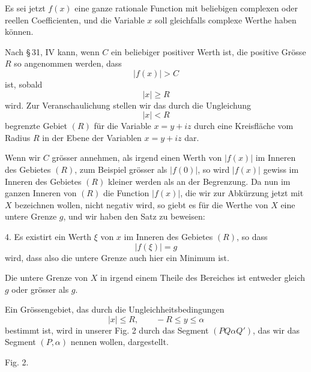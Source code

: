 \documentclass[11pt]{article}
\begin{document}
Es sei jetzt $f(x)$ eine ganze rationale Function mit beliebigen complexen oder reellen Coefficienten, und die Variable $x$ soll gleichfalls complexe Werthe haben können.

Nach \S\,31, IV kann, wenn $C$ ein beliebiger positiver Werth ist, die positive Grösse $R$ so angenommen werden, dass
\begin{equation}
 |f(x)|>C
\tag{4}
\end{equation}
ist, sobald
\begin{equation}
 |x|\ge R
\tag{5}
\end{equation}
wird. Zur Veranschaulichung stellen wir das durch die Ungleichung
\[
 |x|<R
\]
begrenzte Gebiet $(R)$ für die Variable $x=y+iz$ durch eine Kreisfläche vom Radius $R$ in der Ebene der Variablen $x=y+iz$ dar.

Wenn wir $C$ grösser annehmen, als irgend einen Werth von $|f(x)|$ im Inneren des Gebietes $(R)$, zum Beispiel grösser als $|f(0)|$, so wird $|f(x)|$ gewiss im Inneren des Gebietes $(R)$ kleiner werden als an der Begrenzung. Da nun im ganzen Inneren von $(R)$ die Function $|f(x)|$, die wir zur Abkürzung jetzt mit $X$ bezeichnen wollen, nicht negativ wird, so giebt es für die Werthe von $X$ eine untere Grenze $g$, und wir haben den Satz zu beweisen:

4. Es existirt ein Werth $\xi$ von $x$ im Inneren des Gebietes $(R)$, so dass
\begin{equation}
 |f(\xi)|=g
\tag{6}
\end{equation}
wird, dass also die untere Grenze auch hier ein Minimum ist.

Die untere Grenze von $X$ in irgend einem Theile des Bereiches ist entweder gleich $g$ oder grösser als $g$.

Ein Grössengebiet, das durch die Ungleichheitsbedingungen
\begin{equation}
 |x|\le R,\qquad -R\le y\le \alpha
\tag{7}
\end{equation}
bestimmt ist, wird in unserer Fig. 2 durch das Segment $(PQ\alpha Q')$, das wir das Segment $(P,\alpha)$ nennen wollen, dargestellt.

\begin{center}{\small Fig. 2.}\end{center}

\begin{center}
\end{center}
\end{document}
